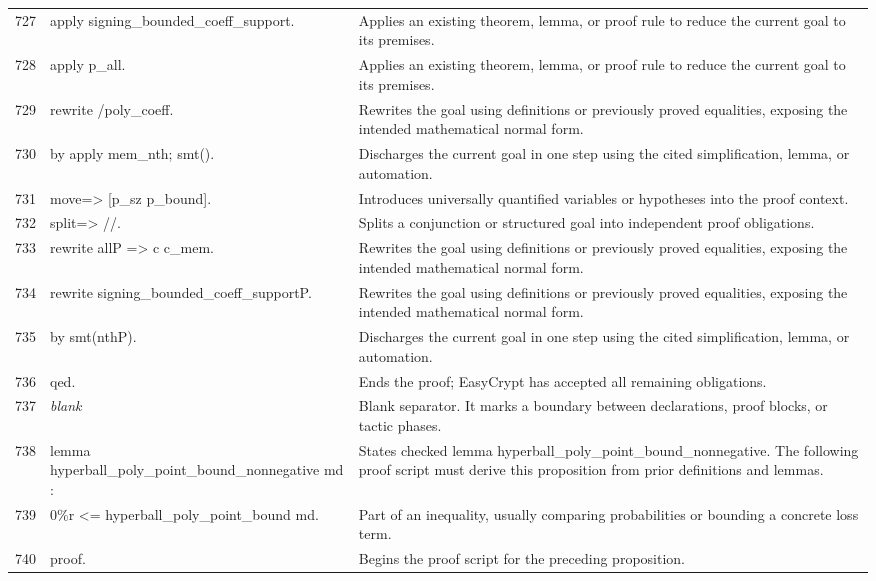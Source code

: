 \documentclass[10pt]{article}
\begin{document}
\begin{longtable}{r L{0.53\textwidth} L{0.37\textwidth}}
727 & {\ttfamily\scriptsize   apply signing\_bounded\_coeff\_support.} & Applies an existing theorem, lemma, or proof rule to reduce the current goal to its premises. \\
728 & {\ttfamily\scriptsize   apply p\_all.} & Applies an existing theorem, lemma, or proof rule to reduce the current goal to its premises. \\
729 & {\ttfamily\scriptsize   rewrite /poly\_coeff.} & Rewrites the goal using definitions or previously proved equalities, exposing the intended mathematical normal form. \\
730 & {\ttfamily\scriptsize   by apply mem\_nth; smt().} & Discharges the current goal in one step using the cited simplification, lemma, or automation. \\
731 & {\ttfamily\scriptsize move=> [p\_sz p\_bound].} & Introduces universally quantified variables or hypotheses into the proof context. \\
732 & {\ttfamily\scriptsize split=> //.} & Splits a conjunction or structured goal into independent proof obligations. \\
733 & {\ttfamily\scriptsize rewrite allP => c c\_mem.} & Rewrites the goal using definitions or previously proved equalities, exposing the intended mathematical normal form. \\
734 & {\ttfamily\scriptsize rewrite signing\_bounded\_coeff\_supportP.} & Rewrites the goal using definitions or previously proved equalities, exposing the intended mathematical normal form. \\
735 & {\ttfamily\scriptsize by smt(nthP).} & Discharges the current goal in one step using the cited simplification, lemma, or automation. \\
736 & {\ttfamily\scriptsize qed.} & Ends the proof; EasyCrypt has accepted all remaining obligations. \\
737 & {\ttfamily\scriptsize \emph{blank}} & Blank separator.  It marks a boundary between declarations, proof blocks, or tactic phases. \\
738 & {\ttfamily\scriptsize lemma hyperball\_poly\_point\_bound\_nonnegative md :} & States checked lemma hyperball\_poly\_point\_bound\_nonnegative.  The following proof script must derive this proposition from prior definitions and lemmas. \\
739 & {\ttfamily\scriptsize   0\%r <= hyperball\_poly\_point\_bound md.} & Part of an inequality, usually comparing probabilities or bounding a concrete loss term. \\
740 & {\ttfamily\scriptsize proof.} & Begins the proof script for the preceding proposition. \\

\end{longtable}
\end{document}
